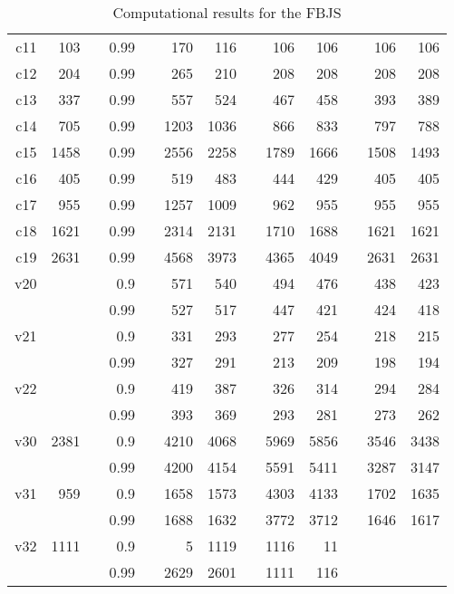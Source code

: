\documentclass[a4paper,10pt]{article}
\begin{document}
\begin{table}[h]
\begin{tabular}{@{\bfseries}rrrrrrrrrrrrr}
	c11  &  103 &      &  0.99 &&  170 &  116 &&  106 &  106 &&  106 &  106 \\
	c12  &  204 &      &  0.99 &&  265 &  210 &&  208 &  208 &&  208 &  208 \\
	c13  &  337 &      &  0.99 &&  557 &  524 &&  467 &  458 &&  393 &  389 \\
	c14  &  705 &      &  0.99 && 1203 & 1036 &&  866 &  833 &&  797 &  788 \\
	c15  & 1458 &      &  0.99 && 2556 & 2258 && 1789 & 1666 && 1508 & 1493 \\
	c16  &  405 &      &  0.99 &&  519 &  483 &&  444 &  429 &&  405 &  405 \\
	c17  &  955 &      &  0.99 && 1257 & 1009 &&  962 &  955 &&  955 &  955 \\
	c18  & 1621 &      &  0.99 && 2314 & 2131 && 1710 & 1688 && 1621 & 1621 \\
	c19  & 2631 &      &  0.99 && 4568 & 3973 && 4365 & 4049 && 2631 & 2631 \\[2ex]
	v20  &      &      &   0.9 &&  571 &  540 &&  494 &  476 &&  438 &  423 \\
	     &      &      &  0.99 &&  527 &  517 &&  447 &  421 &&  424 &  418 \\
	v21  &      &      &   0.9 &&  331 &  293 &&  277 &  254 &&  218 &  215 \\
	     &      &      &  0.99 &&  327 &  291 &&  213 &  209 &&  198 &  194 \\
	v22  &      &      &   0.9 &&  419 &  387 &&  326 &  314 &&  294 &  284 \\
	     &      &      &  0.99 &&  393 &  369 &&  293 &  281 &&  273 &  262 \\
	v30  & 2381 &      &   0.9 && 4210 & 4068 && 5969 & 5856 && 3546 & 3438 \\
	     &      &      &  0.99 && 4200 & 4154 && 5591 & 5411 && 3287 & 3147 \\
	v31  &  959 &      &   0.9 && 1658 & 1573 && 4303 & 4133 && 1702 & 1635 \\
	     &      &      &  0.99 && 1688 & 1632 && 3772 & 3712 && 1646 & 1617 \\
	v32  & 1111 &      &   0.9 && 5 & 1119 && 1116 &   11 &&   & \\
	     &      &      &  0.99 && 2629 & 2601 && 1111 &  116 &&   & \\
	\bottomrule
\end{tabular}
\caption{Computational results for the FBJS}
\label{table:fbjs}
\end{table}
\end{document}
